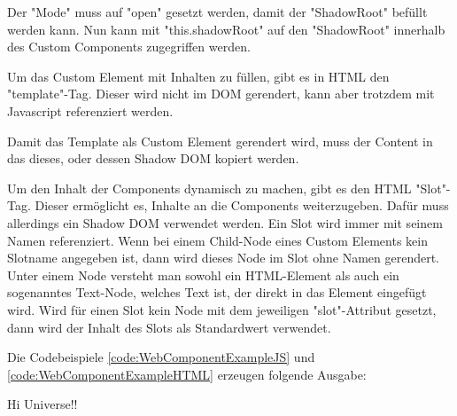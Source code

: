 
Der "Mode" muss auf "{\ttfamily open}" gesetzt werden, damit der "ShadowRoot" befüllt werden kann. Nun kann mit "{\ttfamily this.shadowRoot}" auf den "ShadowRoot" innerhalb des Custom Components zugegriffen werden.
\cite{MDNShadowRoot}

\pagebreak
{}

Um das Custom Element mit Inhalten zu füllen, gibt es in HTML den "template"-Tag. Dieser wird nicht im DOM gerendert, kann aber trotzdem mit Javascript referenziert werden. \cite{MDNtemplate}


Damit das Template als Custom Element gerendert wird, muss der Content in das dieses, oder dessen Shadow DOM kopiert werden.



Um den Inhalt der Components dynamisch zu machen, gibt es den HTML "Slot"-Tag. 
Dieser ermöglicht es, Inhalte an die Components weiterzugeben. 
Dafür muss allerdings ein Shadow DOM verwendet werden. 
Ein Slot wird immer mit seinem Namen referenziert. 
Wenn bei einem Child-Node eines Custom Elements kein Slotname angegeben ist, dann wird dieses Node im Slot ohne Namen gerendert. 
Unter einem Node versteht man sowohl ein HTML-Element als auch ein sogenanntes Text-Node, welches Text ist, der direkt in das Element eingefügt wird. 
Wird für einen Slot kein Node mit dem jeweiligen "{\ttfamily slot}"-Attribut gesetzt, dann wird der Inhalt des Slots als Standardwert verwendet. 
\cite{MDNSlots}

\pagebreak
{}




Die Codebeispiele \ref{code:WebComponentExampleJS} und \ref{code:WebComponentExampleHTML} erzeugen folgende Ausgabe:

{\ttfamily Hi Universe!!}